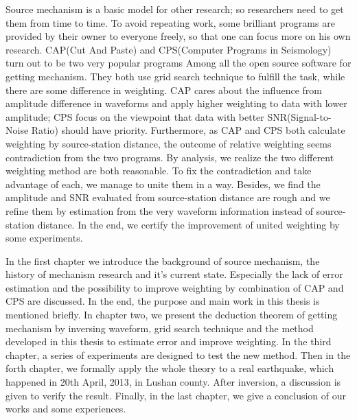 \begin{enabstract}
Source mechanism is a basic model for other research; so researchers need to get them from time to time. To avoid repeating work, some brilliant programs are provided by their owner to everyone freely, so that one can focus more on his own research. CAP(Cut And Paste) and CPS(Computer Programs in Seismology) turn out to be two very popular programs Among all the open source software for getting mechanism. They both use grid search technique to fulfill the task, while there are some difference in weighting. CAP cares about the influence from amplitude difference in waveforms and apply higher weighting to data with lower amplitude; CPS focus on the viewpoint that data with better SNR(Signal-to-Noise Ratio) should have priority. Furthermore, as CAP and CPS both calculate weighting by source-station distance, the outcome of relative weighting seems contradiction from the two programs. By analysis, we realize the two different weighting method are both reasonable. To fix the contradiction and take advantage of each, we manage to unite them in a way. Besides, we find the amplitude and SNR evaluated from source-station distance are rough and we refine them by estimation from the very waveform information instead of source-station distance. In the end, we certify the improvement of united weighting by some experiments.

In the first chapter we introduce the background of source mechanism, the history of mechanism research and it's current state. Especially the lack of error estimation and the possibility to improve weighting by combination of CAP and CPS are discussed. In the end, the purpose and main work in this thesis is mentioned briefly. In chapter two, we present the deduction theorem of getting mechanism by inversing waveform, grid search technique and the method developed in this thesis to estimate error and improve weighting. In the third chapter, a series of experiments are designed to test the new method. Then in the forth chapter, we formally apply the whole theory to a real earthquake, which happened in 20th April, 2013, in Lushan county. After inversion, a discussion is given to verify the result. Finally, in the last chapter, we give a conclusion of our works and some experiences.

\end{enabstract}
\vspace{1em}\par\vfill

